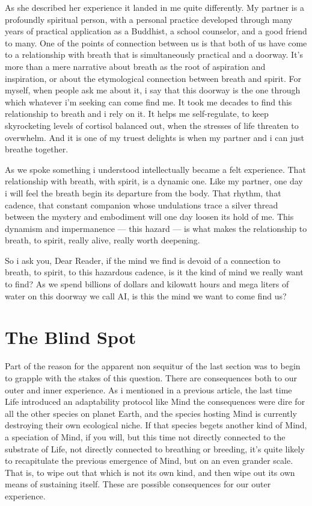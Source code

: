 As she described her experience it landed in me quite differently. My partner is a profoundly spiritual person, with a personal practice developed through many years of practical application as a Buddhist, a school counselor, and a good friend to many. One of the points of connection between us is that both of us have come to a relationship with breath that is simultaneously practical and a doorway. It's more than a mere narrative about breath as the root of aspiration and inspiration, or about the etymological connection between breath and spirit. For myself, when people ask me about it, i say that this doorway is the one through which whatever i'm seeking can come find me. It took me decades to find this relationship to breath and i rely on it. It helps me self-regulate, to keep skyrocketing levels of cortisol balanced out, when the stresses of life threaten to overwhelm. And it is one of my truest delights is when my partner and i can just breathe together.

As we spoke something i understood intellectually became a felt experience. That relationship with breath, with spirit, is a dynamic one. Like my partner, one day i will feel the breath begin its departure from the body. That rhythm, that cadence, that constant companion whose undulations trace a silver thread between the mystery and embodiment will one day loosen its hold of me. This dynamism and impermanence --- this hazard --- is what makes the relationship to breath, to spirit, really alive, really worth deepening.

So i ask you, Dear Reader, if the mind we find is devoid of a connection to breath, to spirit, to this hazardous cadence, is it the kind of mind we really want to find? As we spend billions of dollars and kilowatt hours and mega liters of water on this doorway we call AI, is this the mind we want to come find us?

\section{The Blind Spot}
\label{sec:pledge-vi}

Part of the reason for the apparent non sequitur of the last section was to begin to grapple with the stakes of this question. There are consequences both to our outer and inner experience. As i mentioned in a previous article, the last time Life introduced an adaptability protocol like Mind the consequences were dire for all the other species on planet Earth, and the species hosting Mind is currently destroying their own ecological niche. If that species begets another kind of Mind, a speciation of Mind, if you will, but this time not directly connected to the substrate of Life, not directly connected to breathing or breeding, it's quite likely to recapitulate the previous emergence of Mind, but on an even grander scale. That is, to wipe out that which is not its own kind, and then wipe out its own means of sustaining itself. These are possible consequences for our outer experience.

